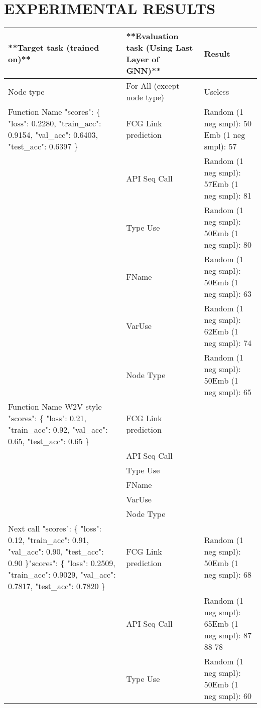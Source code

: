 \documentclass[a4paper,twoside]{article}
\begin{document}
\section{\uppercase{Experimental Results}}

\begin{table*}
    \centering
    \begin{tabular}{|p{4cm}|p{5cm}|p{5cm}|}
    \hline
        **Target task (trained on)** & **Evaluation task (Using Last Layer of GNN)** & Result \\ \hline
        Node type & For All (except node type) & Useless \\ \hline
        Function Name "scores": \{    "loss": 0.2280,    "train\_acc": 0.9154,    "val\_acc": 0.6403,    "test\_acc": 0.6397  \} & FCG Link prediction & Random (1 neg smpl): 50 Emb (1 neg smpl): 57 \\ \hline
         & API Seq Call & Random (1 neg smpl): 57Emb (1 neg smpl): 81 \\ \hline
         & Type Use & Random (1 neg smpl): 50Emb (1 neg smpl): 80 \\ \hline
         & FName & Random (1 neg smpl): 50Emb (1 neg smpl): 63 \\ \hline
         & VarUse & Random (1 neg smpl): 62Emb (1 neg smpl): 74 \\ \hline
         & Node Type & Random (1 neg smpl): 50Emb (1 neg smpl): 65 \\ \hline
        Function Name W2V style "scores": \{    "loss": 0.21,    "train\_acc": 0.92,    "val\_acc": 0.65,    "test\_acc": 0.65  \} & FCG Link prediction &  \\ \hline
         & API Seq Call &  \\ \hline
         & Type Use &  \\ \hline
         & FName &  \\ \hline
         & VarUse &  \\ \hline
         & Node Type &  \\ \hline
        Next call "scores": \{     "loss": 0.12,    "train\_acc": 0.91,    "val\_acc": 0.90,    "test\_acc": 0.90  \}"scores": \{    "loss": 0.2509,    "train\_acc": 0.9029,    "val\_acc": 0.7817,    "test\_acc": 0.7820  \} & FCG Link prediction & Random (1 neg smpl): 50Emb (1 neg smpl): 68 \\ \hline
         & API Seq Call & Random (1 neg smpl): 65Emb (1 neg smpl): 87 88 78 \\ \hline
         & Type Use & Random (1 neg smpl): 50Emb (1 neg smpl): 60 \\ \hline

\end{tabular}
\end{table*}
\end{document}
